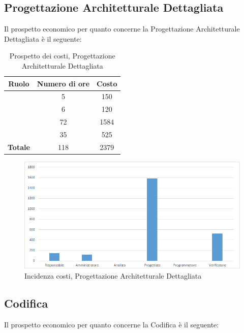 \subsection{Progettazione Architetturale Dettagliata}
Il prospetto economico per quanto concerne la Progettazione Architetturale Dettagliata è il seguente:


\begin{table}[H]
	\begin{center}
		\begin{tabular}{|c|c|c|}
			\hline
			\textbf{Ruolo}	& \textbf{Numero di ore} & \textbf{Costo} \\
			\hline
			\Res	&	5  &	150	\\
			\hline
			\Amm	&	6  &	120	\\
			\hline
			\Prog	&	72  &	1584	\\
			\hline
			\Ver	&	35  &	525	\\
			\hline
			\textbf{Totale}  &	118 &	2379	\\
			\hline
		\end{tabular}
	\end{center}
	\caption{Prospetto dei costi, Progettazione Architetturale Dettagliata }
\end{table}

\begin{figure}[H]
	\centering
	\includegraphics[scale=0.6]{img/8-3.png}
	\caption{Incidenza costi, Progettazione Architetturale Dettagliata}
\end{figure}

\subsection{Codifica}
Il prospetto economico per quanto concerne la Codifica è il seguente:


